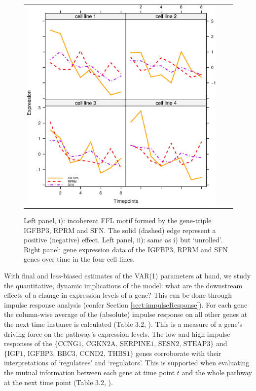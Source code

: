\begin{figure}[t!]
\begin{tabular}{ccc}
\includegraphics[scale=0.41, angle=0]{motif_incoherentFFL_data.eps}
\end{tabular}
\caption{Left panel, i): incoherent FFL motif formed by the gene-triple IGFBP3, RPRM and SFN. The solid (dashed) edge represent a positive (negative) effect. Left panel, ii): same as i) but `unrolled'. Right panel: gene expression data of the IGFBP3, RPRM and SFN genes over time in the four cell lines. }
\label{fig:motif_incoherentFFL}
\end{figure}
 \afterpage{\clearpage}


With final and less-biased estimates of the VAR(1) parameters at hand, we study the quantitative, dynamic implications of the model: what are the downstream effects of a change in expression levels of a gene? This can be done through impulse response analysis (confer Section \ref{sect:impulseResponse}). For each gene the column-wise average of the (absolute) impulse response on all other genes at the next time instance is calculated (Table 3.2, \cite{Supp2018}). This is a measure of a gene's driving force on the pathway's expression levels. The low and high impulse responses of the $\{\mbox{CCNG1, CGKN2A, SERPINE1, SESN2, STEAP3}\}$ and \\ $\{\mbox{IGF1, IGFBP3, BBC3, CCND2, THBS1}\}$ genes corroborate with their interpretations of `regulatees' and `regulators'. This is supported when evaluating the mutual information between each gene at time point $t$ and the whole pathway at the next time point (Table 3.2, \cite{Supp2018}). 


